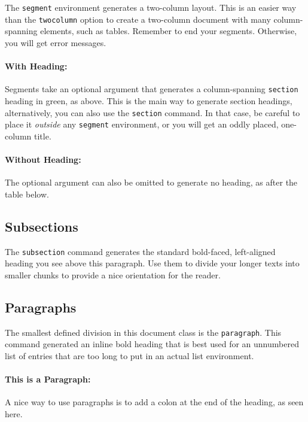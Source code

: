 \documentclass[
]{dragonbane-supplement}
\begin{document}
\begin{segment}[Segments]

The \texttt{segment} environment generates a two-column layout. This is an easier way than the \texttt{twocolumn} option to create a two-column document with many column-spanning elements, such as tables. Remember to end your segments. Otherwise, you will get error messages.

\paragraph{With Heading:}
Segments take an optional argument that generates a column-spanning \texttt{section} heading in green, as above. This is the main way to generate section headings, alternatively, you can also use the \texttt{section} command. In that case, be careful to place it \emph{outside} any \texttt{segment} environment, or you will get an oddly placed, one-column title.


\paragraph{Without Heading:}
The optional argument can also be omitted to generate no heading, as after the table below.

\subsection{Subsections}
The \texttt{subsection} command generates the standard bold-faced, left-aligned heading you see above this paragraph. Use them to divide your longer texts into smaller chunks to provide a nice orientation for the reader.

\subsection{Paragraphs}
The smallest defined division in this document class is the \texttt{paragraph}. This command generated an inline bold heading that is best used for an unnumbered list of entries that are too long to put in an actual list environment.

\paragraph{This is a Paragraph:}
A nice way to use paragraphs is to add a colon at the end of the heading, as seen here.
\end{segment}
\end{document}
